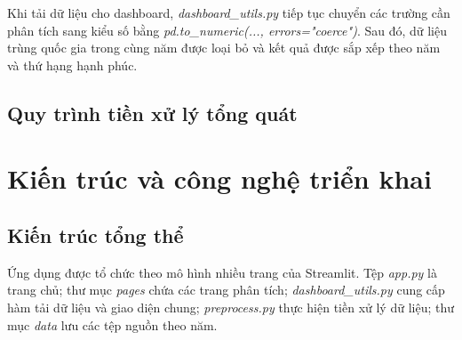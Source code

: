 Khi tải dữ liệu cho dashboard, \textit{dashboard\_utils.py} tiếp tục chuyển các trường cần phân tích sang kiểu số bằng \textit{pd.to\_numeric(..., errors="coerce")}. Sau đó, dữ liệu trùng quốc gia trong cùng năm được loại bỏ và kết quả được sắp xếp theo năm và thứ hạng hạnh phúc.

\subsection{Quy trình tiền xử lý tổng quát}

\vspace{\baselineskip}
\begin{sodo}[H]
\centering
{}
\label{fig:quy-trinh-tien-xu-ly}
\end{sodo}
\vspace{\baselineskip}

\section{Kiến trúc và công nghệ triển khai}

\subsection{Kiến trúc tổng thể}

Ứng dụng được tổ chức theo mô hình nhiều trang của Streamlit. Tệp \textit{app.py} là trang chủ; thư mục \textit{pages} chứa các trang phân tích; \textit{dashboard\_utils.py} cung cấp hàm tải dữ liệu và giao diện chung; \textit{preprocess.py} thực hiện tiền xử lý dữ liệu; thư mục \textit{data} lưu các tệp nguồn theo năm.

